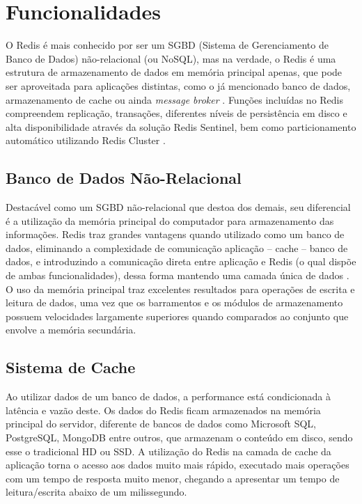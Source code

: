\documentclass[12pt]{article}
\begin{document}
\section{Funcionalidades}

O Redis é mais conhecido por ser um SGBD (Sistema de Gerenciamento de Banco de Dados) não-relacional (ou NoSQL), mas na verdade, o Redis é uma estrutura de armazenamento de dados em memória principal apenas, que pode ser aproveitada para aplicações distintas, como o já mencionado banco de dados, armazenamento de cache ou ainda \textit{message broker} \cite{aws2020}. Funções incluídas no Redis compreendem replicação, transações, diferentes níveis de persistência em disco e alta disponibilidade através da solução Redis Sentinel, bem como particionamento automático utilizando Redis Cluster \cite{redis2020}.

\subsection{Banco de Dados Não-Relacional}

Destacável como um SGBD não-relacional que destoa dos demais, seu diferencial é a utilização da memória principal do computador para armazenamento das informações. Redis traz grandes vantagens quando utilizado como um banco de dados, eliminando a complexidade de comunicação aplicação – cache – banco de dados, e introduzindo a comunicação direta entre aplicação e Redis (o qual dispõe de ambas funcionalidades), dessa forma mantendo uma camada única de dados \cite{davis2020}. 
O uso da memória principal traz excelentes resultados para operações de escrita e leitura de dados, uma vez que os barramentos e os módulos de armazenamento possuem velocidades largamente superiores quando comparados ao conjunto que envolve a memória secundária. 

\subsection{Sistema de Cache}
Ao utilizar dados de um banco de dados, a performance está condicionada à latência e vazão deste. Os dados do Redis ficam armazenados na memória principal do servidor, diferente de bancos de dados como Microsoft SQL, PostgreSQL, MongoDB entre outros, que armazenam o conteúdo em disco, sendo esse o tradicional HD ou SSD. A utilização do Redis na camada de cache da aplicação torna o acesso aos dados muito mais rápido, executado mais operações com um tempo de resposta muito menor, chegando a apresentar um tempo de leitura/escrita abaixo de um milissegundo. 
\end{document}
